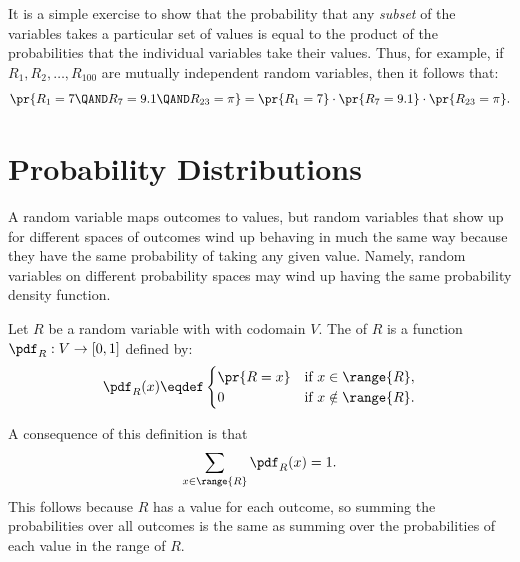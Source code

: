 It is a simple exercise to show that the probability that any
\emph{subset} of the variables takes a particular set of values is equal
to the product of the probabilities that the individual variables take
their values.  Thus, for example, if $R_1, R_2, \dots, R_{100}$ are
mutually independent random variables, then it follows that:
\[
\pr{R_1 = 7 \QAND R_7 = 9.1 \QAND R_{23} = \pi} = \pr{R_1 = 7} \cdot
\pr{R_7 = 9.1} \cdot \pr{R_{23} = \pi}.
\]


\section{Probability Distributions}\label{distributions_sec}

A random variable maps outcomes to values, but random variables that show
up for different spaces of outcomes wind up behaving in much the same way
because they have the same probability of taking any given value.  Namely,
random variables on different probability spaces may wind up having the
same probability density function.

\begin{definition}
Let $R$ be a random variable with with codomain $V$.
The  of $R$
is a function $\pdf_R : V \to [0,1]$ defined by:
%
\[
\pdf_R(x) \eqdef \begin{cases}
            \pr{R = x} & \text{if } x \in \range{R},\\
             0 & \text{if } x \notin \range{R}.
           \end{cases}
\]
\end{definition}
%
A consequence of this definition is that
%
\[
\sum_{x \in \range{R}} \pdf_R(x) = 1.
\]
This follows because $R$ has a value for each outcome, so summing the
probabilities over all outcomes is the same as summing over the
probabilities of each value in the range of $R$.

